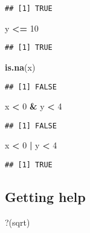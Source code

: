 \documentclass[
  a4paper,
]{article}
\newenvironment{Shaded}{\begin{snugshade}}{\end{snugshade}}
\newcommand{\AttributeTok}[1]{\textcolor[rgb]{0.13,0.29,0.53}{#1}}
\newcommand{\DecValTok}[1]{\textcolor[rgb]{0.00,0.00,0.81}{#1}}
\newcommand{\FunctionTok}[1]{\textcolor[rgb]{0.13,0.29,0.53}{\textbf{#1}}}
\newcommand{\NormalTok}[1]{#1}
\newcommand{\SpecialCharTok}[1]{\textcolor[rgb]{0.81,0.36,0.00}{\textbf{#1}}}
\newcommand{\StringTok}[1]{\textcolor[rgb]{0.31,0.60,0.02}{#1}}
\begin{document}
\begin{verbatim}
## [1] TRUE
\end{verbatim}

\begin{Shaded}
\begin{Highlighting}[]
\NormalTok{y }\SpecialCharTok{\textless{}=} \DecValTok{10}
\end{Highlighting}
\end{Shaded}

\begin{verbatim}
## [1] TRUE
\end{verbatim}

\begin{Shaded}
\begin{Highlighting}[]
\FunctionTok{is.na}\NormalTok{(x)}
\end{Highlighting}
\end{Shaded}

\begin{verbatim}
## [1] FALSE
\end{verbatim}

\begin{Shaded}
\begin{Highlighting}[]
\NormalTok{x }\SpecialCharTok{\textless{}} \DecValTok{0} \SpecialCharTok{\&}\NormalTok{ y }\SpecialCharTok{\textless{}} \DecValTok{4}
\end{Highlighting}
\end{Shaded}

\begin{verbatim}
## [1] FALSE
\end{verbatim}

\begin{Shaded}
\begin{Highlighting}[]
\NormalTok{x }\SpecialCharTok{\textless{}} \DecValTok{0} \SpecialCharTok{|}\NormalTok{ y }\SpecialCharTok{\textless{}} \DecValTok{4}
\end{Highlighting}
\end{Shaded}

\begin{verbatim}
## [1] TRUE
\end{verbatim}

\subsection{Getting help}\label{getting-help}

\begin{Shaded}
\begin{Highlighting}[]
\StringTok{\textasciigrave{}}\AttributeTok{?}\StringTok{\textasciigrave{}}\NormalTok{(sqrt)}
\end{Highlighting}
\end{Shaded}
\end{document}
